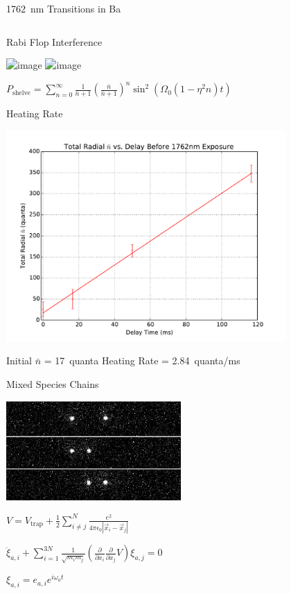 \documentclass{beamer}
\begin{document}
\begin{frame}{1762~nm Transitions in Ba}
\begin{columns}[c]
\end{columns}
\end{frame}

\begin{frame}{Rabi Flop Interference}
	\centerline{
		\includegraphics<1>[height=0.7\textheight]{HeatingRateT0Orange}
		\includegraphics<2>[height=0.7\textheight]{HeatingRateBoth}
	}
	\centerline{$P_\mathrm{shelve} = \sum\limits_{n=0}^{\infty} \frac{1}{\bar{n} + 1} \left( \frac{\bar{n}}{\bar{n}+1} \right)^n \sin^2\left( \Omega_0 (1 - \eta^2 n ) t \right)$}
\end{frame}

\begin{frame}{Heating Rate}
	\centerline{\includegraphics[width=0.8\textwidth]{HeatingRateNoise}}
	\centerline{Initial $\bar{n}$ = 17~quanta \; \;  Heating Rate = 2.84~quanta/ms}
\end{frame}

\begin{frame}{Mixed Species Chains}
	\centerline{\includegraphics[width=0.5\textwidth]{BaYb}}
	\vfill
	\pause
	\centerline{$V = V_\mathrm{trap} + \frac{1}{2}\sum\limits_{i \ne j}^N \frac{e^2}{4\pi\epsilon_0 \left| \vec{x}_i - \vec{x}_j \right|}$}
	\centerline{$\ddot{\xi}_{a,i} + \sum\limits_{i=1}^{3N} \frac{1}{\sqrt{m_i m_j}} \left( \frac{\partial}{\partial x_i}\frac{\partial}{\partial x_j} V \right) \xi_{a,j} = 0$}
	\centerline{$\xi_{a,i} = e_{a,i} e^{i \omega_a t}$}
\end{frame}
\end{document}

